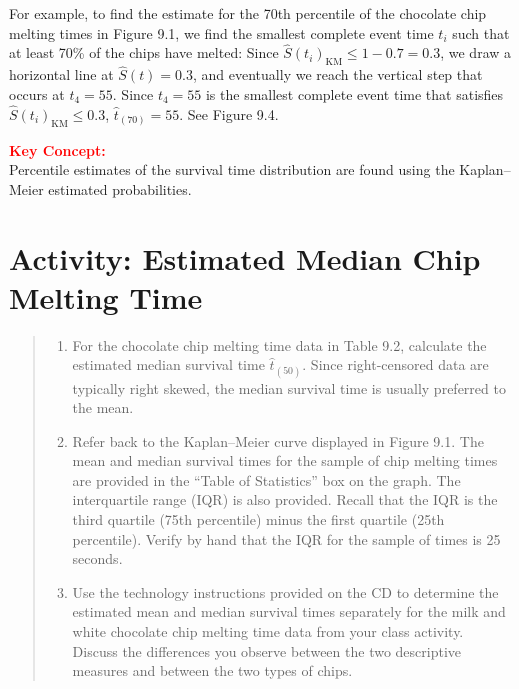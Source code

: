 \documentclass[
]{report}
\providecommand{\tightlist}{%
  \setlength{\itemsep}{0pt}\setlength{\parskip}{0pt}}
\begin{document}
For example, to find the estimate for the 70th percentile of the chocolate chip melting times in Figure 9.1, we find the smallest complete event time \(t_i\) such that at least 70\% of the chips have melted: Since \(\hat S(t_i)_{\mathrm{KM}} \le 1 - 0.7 = 0.3\), we draw a horizontal line at \(\hat S(t) = 0.3\), and eventually we reach the vertical step that occurs at \(t_4 = 55\). Since \(t_4 = 55\) is the smallest complete event time that satisfies \(\hat S(t_i)_{\mathrm{KM}} \le 0.3\), \(\hat t_{(70)} = 55\). See Figure 9.4.

\large

\textbf{\textcolor{red}{Key Concept:}}\\
\color{red}
Percentile estimates of the survival time distribution are found using the Kaplan--Meier estimated probabilities.\\
\color{black}
\normalsize

\section*{Activity: Estimated Median Chip Melting Time}\label{activity-estimated-median-chip-melting-time}

\begin{quote}
\begin{enumerate}
\def\labelenumi{\arabic{enumi}.}
\setcounter{enumi}{22}
\tightlist
\item
  For the chocolate chip melting time data in Table 9.2, calculate the estimated median survival time \(\hat t_{(50)}\). Since right-censored data are typically right skewed, the median survival time is usually preferred to the mean.\\
\item
  Refer back to the Kaplan--Meier curve displayed in Figure 9.1. The mean and median survival times for the sample of chip melting times are provided in the ``Table of Statistics'' box on the graph. The interquartile range (IQR) is also provided. Recall that the IQR is the third quartile (75th percentile) minus the first quartile (25th percentile). Verify by hand that the IQR for the sample of times is 25 seconds.\\
\item
  Use the technology instructions provided on the CD to determine the estimated mean and median survival times separately for the milk and white chocolate chip melting time data from your class activity. Discuss the differences you observe between the two descriptive measures and between the two types of chips.
\end{enumerate}
\end{quote}
\end{document}
